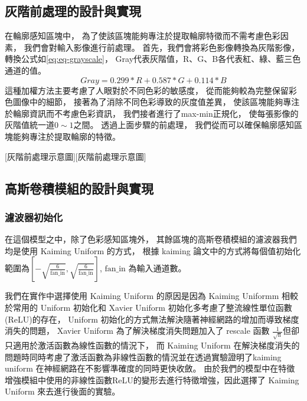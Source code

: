 \documentclass[class=NCU_thesis, crop=false]{standalone}
\begin{document}
	\subsection{灰階前處理的設計與實現}
		在輪廓感知區塊中，
		為了使該區塊能夠專注於提取輪廓特徵而不需考慮色彩因素，
		我們會對輸入影像進行前處理。
		首先，我們會將彩色影像轉換為灰階影像，
		轉換公式如\cref{eq:eq-grayscale}，
		Gray代表灰階值，R、G、B各代表紅、綠、藍三色通道的值。
		\begin{equation}
		    \label{eq:eq-grayscale}
		    Gray = 0.299 * R + 0.587 * G + 0.114 * B
		\end{equation}
		這種加權方法主要考慮了人眼對於不同色彩的敏感度，
		從而能夠較為完整保留彩色圖像中的細節，
		接著為了消除不同色彩導致的灰度值差異，
		使該區塊能夠專注於輪廓資訊而不考慮色彩資訊，
		我們接者進行了max-min正規化，
		使每張影像的灰階值統一道$0\sim1$之間。
		透過上面步驟的前處理，
		我們從而可以確保輪廓感知區塊能夠專注於提取輪廓的特徵。

		[灰階前處理示意圖][灰階前處理示意圖]

	\subsection{高斯卷積模組的設計與實現}
		\subsubsection{濾波器初始化}
			在這個模型之中，除了色彩感知區塊外，
			其餘區塊的高斯卷積模組的濾波器我們均是使用 Kaiming Uniform 的方式，
			根據 kaiming 論文\cite{DBLP:journals/corr/HeZR015}中的方式將每個值初始化範圍為$[-\sqrt{\frac{6}{\text{fan\_in}}}, \sqrt{\frac{6}{\text{fan\_in}}}]$,
			$\text{fan\_in}$ 為輸入通道數。

			我們在實作中選擇使用 Kaiming Uniform 的原因是因為 Kaiming Uniformm 相較於常用的 Uniform 初始化和 Xavier Uniform\cite{pmlr-v9-glorot10a} 初始化多考慮了整流線性單位函數(ReLU)的存在，
			Uniform 初始化的方式無法解決隨著神經網路的增加而導致梯度消失的問題，
			Xavier Uniform 為了解決梯度消失問題加入了 rescale 函數 $\frac{1}{\sqrt{\text{n}}}$但卻只適用於激活函數為線性函數的情況下，
			而 Kaiming Uniform 在解決梯度消失的問題時同時考慮了激活函數為非線性函數的情況並在\cite{DBLP:journals/corr/HeZR015}透過實驗證明了kaiming uniform 在神經網路在不影響準確度的同時更快收斂。
			由於我們的模型中在特徵增強模組中使用的非線性函數ReLU的變形去進行特徵增強，因此選擇了 Kaiming Uniform 來去進行後面的實驗。
\end{document}
